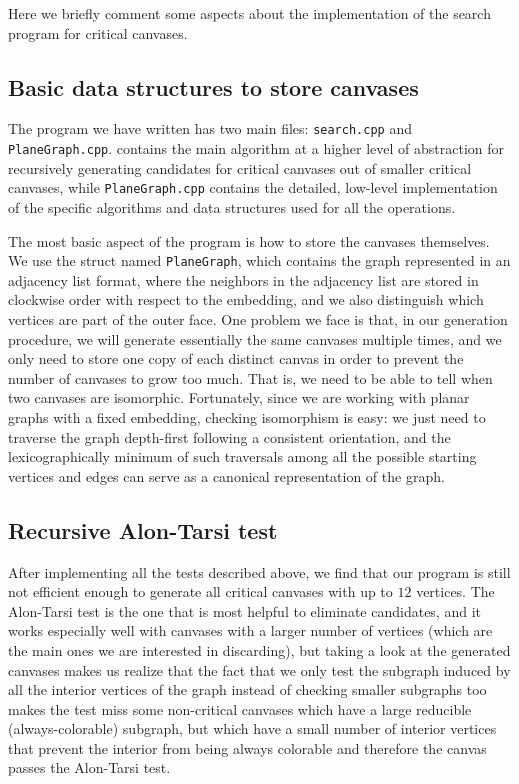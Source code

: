 \documentclass{article}
\begin{document}
Here we briefly comment some aspects about the implementation of the search program for critical canvases.

\subsection{Basic data structures to store canvases}

The program we have written has two main files: \texttt{search.cpp} and \texttt{PlaneGraph.cpp}.  contains the main algorithm at a higher level of abstraction for recursively generating candidates for critical canvases out of smaller critical canvases, while \texttt{PlaneGraph.cpp} contains the detailed, low-level implementation of the specific algorithms and data structures used for all the operations.

The most basic aspect of the program is how to store the canvases themselves. We use the struct named \texttt{PlaneGraph}, which contains the graph represented in an adjacency list format, where the neighbors in the adjacency list are stored in clockwise order with respect to the embedding, and we also distinguish which vertices are part of the outer face. One problem we face is that, in our generation procedure, we will generate essentially the same canvases multiple times, and we only need to store one copy of each distinct canvas in order to prevent the number of canvases to grow too much. That is, we need to be able to tell when two canvases are isomorphic. Fortunately, since we are working with planar graphs with a fixed embedding, checking isomorphism is easy: we just need to traverse the graph depth-first following a consistent orientation, and the lexicographically minimum of such traversals among all the possible starting vertices and edges can serve as a canonical representation of the graph.

\subsection{Recursive Alon-Tarsi test}

After implementing all the tests described above, we find that our program is still not efficient enough to generate all critical canvases with up to $12$ vertices. The Alon-Tarsi test is the one that is most helpful to eliminate candidates, and it works especially well with canvases with a larger number of vertices (which are the main ones we are interested in discarding), but taking a look at the generated canvases makes us realize that the fact that we only test the subgraph induced by all the interior vertices of the graph instead of checking smaller subgraphs too makes the test miss some non-critical canvases which have a large reducible (always-colorable) subgraph, but which have a small number of interior vertices that prevent the interior from being always colorable and therefore the canvas passes the Alon-Tarsi test. 
\end{document}

